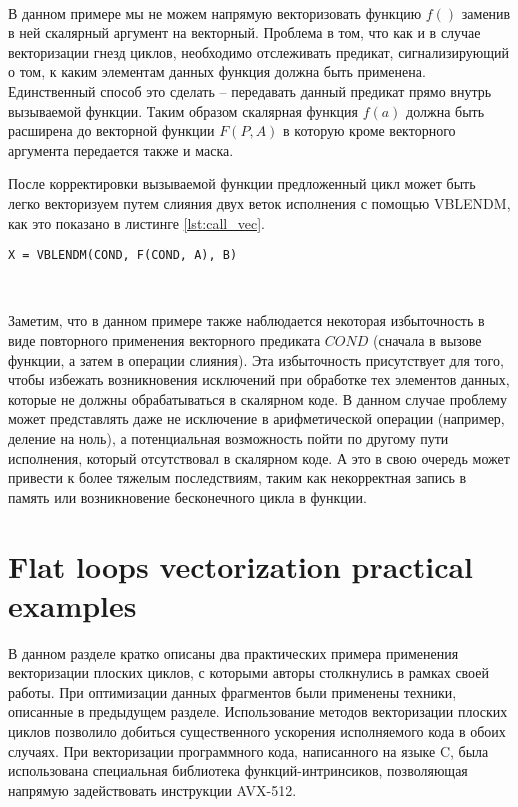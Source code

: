 \documentclass[
11pt,%
tightenlines,%
twoside,%
onecolumn,%
nofloats,%
nobibnotes,%
nofootinbib,%
superscriptaddress,%
noshowpacs,%
centertags]%
{revtex4}
\begin{document}
\

В данном примере мы не можем напрямую векторизовать функцию $f()$ заменив в ней скалярный аргумент на векторный.
Проблема в том, что как и в случае векторизации гнезд циклов, необходимо отслеживать предикат, сигнализирующий о том, к каким элементам данных функция должна быть применена.
Единственный способ это сделать -- передавать данный предикат прямо внутрь вызываемой функции.
Таким образом скалярная функция $f(a)$ должна быть расширена до векторной функции $F(P, A)$ в которую кроме векторного аргумента передается также и маска.

После корректировки вызываемой функции предложенный цикл может быть легко векторизуем путем слияния двух веток исполнения с помощью VBLENDM, как это показано в листинге \ref{lst:call_vec}.

\begin{lstlisting}[caption={Векторизация плоского цикла с вызовом функции под условием},label={lst:call_vec}]
X = VBLENDM(COND, F(COND, A), B)

\end{lstlisting}

\

Заметим, что в данном примере также наблюдается некоторая избыточность в виде повторного применения векторного предиката $COND$ (сначала в вызове функции, а затем в операции слияния).
Эта избыточность присутствует для того, чтобы избежать возникновения исключений при обработке тех элементов данных, которые не должны обрабатываться в скалярном коде.
В данном случае проблему может представлять даже не исключение в арифметической операции (например, деление на ноль), а потенциальная возможность пойти по другому пути исполнения, который отсутствовал в скалярном коде.
А это в свою очередь может привести к более тяжелым последствиям, таким как некорректная запись в память или возникновение бесконечного цикла в функции.

\section{Flat loops vectorization practical examples}

В данном разделе кратко описаны два практических примера применения векторизации плоских циклов, с которыми авторы столкнулись в рамках своей работы.
При оптимизации данных фрагментов были применены техники, описанные в предыдущем разделе.
Использование методов векторизации плоских циклов позволило добиться существенного ускорения исполняемого кода в обоих случаях.
При векторизации программного кода, написанного на языке C, была использована специальная библиотека функций-интринсиков, позволяющая напрямую задействовать инструкции AVX-512.
\end{document}

